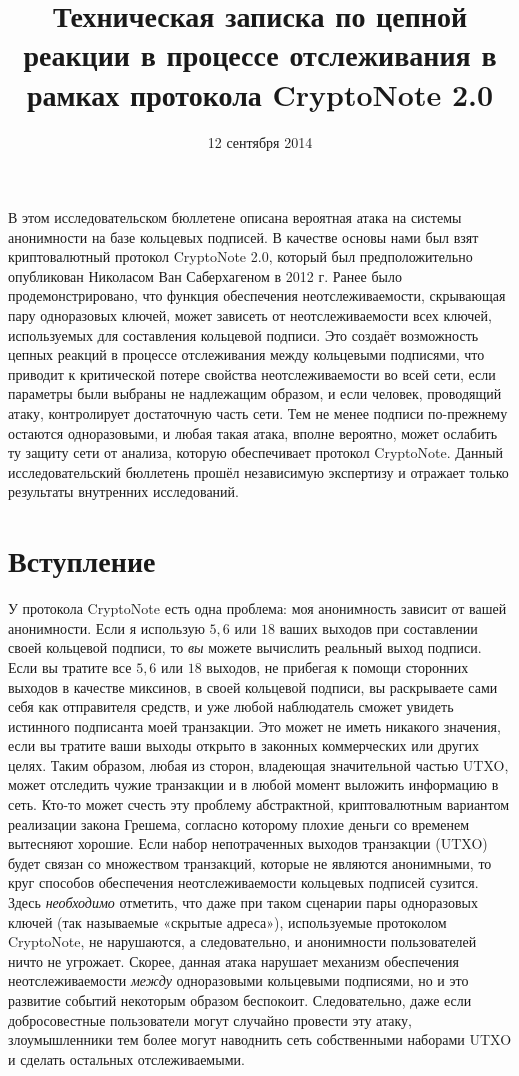 \documentclass{mrl}
\title{Техническая записка по цепной реакции в процессе отслеживания в рамках протокола CryptoNote 2.0}
\date{12 сентября 2014 }
\begin{document}
\begin{center}
{}
\end{center}

В этом исследовательском бюллетене описана вероятная атака на системы анонимности на базе кольцевых подписей. В качестве основы нами был взят криптовалютный протокол CryptoNote 2.0, который был предположительно опубликован Николасом Ван Саберхагеном в 2012 г. Ранее было продемонстрировано, что функция обеспечения неотслеживаемости, скрывающая пару одноразовых ключей, может зависеть от неотслеживаемости всех ключей, используемых для составления кольцевой подписи. Это создаёт возможность цепных реакций в процессе отслеживания между кольцевыми подписями, что приводит к критической потере свойства неотслеживаемости во всей сети, если параметры были выбраны не надлежащим образом, и если человек, проводящий атаку, контролирует достаточную часть сети. Тем не менее подписи по-прежнему остаются одноразовыми, и любая такая атака, вполне вероятно, может ослабить ту защиту сети от анализа, которую обеспечивает протокол CryptoNote. Данный исследовательский бюллетень прошёл независимую экспертизу и отражает только результаты внутренних исследований.

\section{Вступление}
У протокола CryptoNote есть одна проблема: моя анонимность зависит от вашей анонимности. Если я использую $5, 6$ или $18$ ваших выходов при составлении своей кольцевой подписи, то \emph{вы} можете вычислить реальный выход подписи. Если вы тратите все $5, 6$ или $18$ выходов, не прибегая к помощи сторонних выходов в качестве миксинов, в своей кольцевой подписи, вы раскрываете сами себя как отправителя средств, и уже любой наблюдатель сможет увидеть истинного подписанта моей транзакции. Это может не иметь никакого значения, если вы тратите ваши выходы открыто в законных коммерческих или других целях. Таким образом, любая из сторон, владеющая значительной частью UTXO, может отследить чужие транзакции и в любой момент выложить информацию в сеть. Кто-то может счесть эту проблему абстрактной, криптовалютным вариантом реализации закона Грешема, согласно которому плохие деньги со временем вытесняют хорошие. Если набор непотраченных выходов транзакции (UTXO) будет связан со множеством транзакций, которые не являются анонимными, то круг способов обеспечения неотслеживаемости кольцевых подписей сузится. Здесь \emph{необходимо} отметить, что даже при таком сценарии пары одноразовых ключей (так называемые «скрытые адреса»), используемые протоколом CryptoNote, не нарушаются, а следовательно, и анонимности пользователей ничто не угрожает. Скорее, данная атака нарушает механизм обеспечения неотслеживаемости \emph{между} одноразовыми кольцевыми подписями, но и это развитие событий некоторым образом беспокоит. Следовательно, даже если добросовестные пользователи могут случайно провести эту атаку, злоумышленники тем более могут наводнить сеть собственными наборами UTXO и сделать остальных отслеживаемыми.
\end{document}
